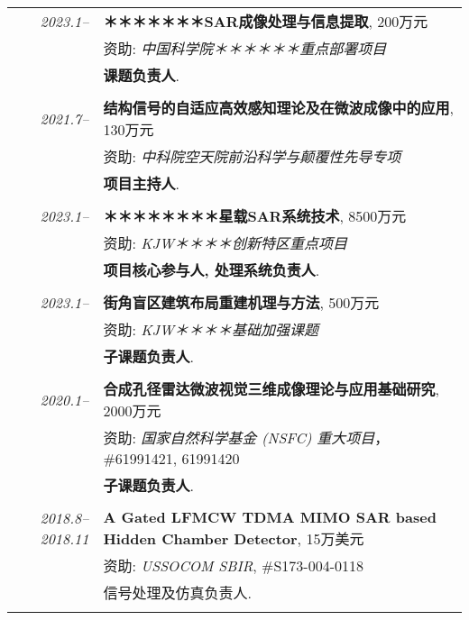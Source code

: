 \documentclass[paper=a4,fontsize=11pt]{scrartcl}
\begin{document}
\begin{longtable}{r|p{12cm}}
	\emph{2023.1--} & \textbf{＊＊＊＊＊＊＊SAR成像处理与信息提取}, 200万元 \\
	& 资助: \emph{中国科学院＊＊＊＊＊＊重点部署项目}\\
	& \textbf{课题负责人}.\\
	\multicolumn{2}{c}{} \\
	
	\emph{2021.7--} & \textbf{结构信号的自适应高效感知理论及在微波成像中的应用}, 130万元 \\
	& 资助: \emph{中科院空天院前沿科学与颠覆性先导专项}\\
	& \textbf{项目主持人}.\\
	\multicolumn{2}{c}{} \\
	
	\emph{2023.1--} & \textbf{＊＊＊＊＊＊＊＊星载SAR系统技术}, 8500万元 \\
	& 资助: \emph{KJW＊＊＊＊创新特区重点项目}\\
	& \textbf{项目核心参与人, 处理系统负责人}.\\
	\multicolumn{2}{c}{} \\
	
	\emph{2023.1--} & \textbf{街角盲区建筑布局重建机理与方法}, 500万元 \\
	& 资助: \emph{KJW＊＊＊＊基础加强课题}\\
	& \textbf{子课题负责人}.\\
	\multicolumn{2}{c}{} \\
	
	\emph{2020.1--} & \textbf{合成孔径雷达微波视觉三维成像理论与应用基础研究}, 2000万元 \\
	& 资助: \emph{国家自然科学基金 (NSFC) 重大项目}， \#61991421, 61991420\\
	& \textbf{子课题负责人}.\\
	\multicolumn{2}{c}{} \\

	
	\emph{2018.8--2018.11} & \textbf{A Gated LFMCW TDMA MIMO SAR based Hidden Chamber Detector}, 15万美元 \\
	& 资助: \emph{USSOCOM SBIR}, \#S173-004-0118\\
	& 信号处理及仿真负责人.\\
	\multicolumn{2}{c}{} \\
	

\end{longtable}
\end{document}
